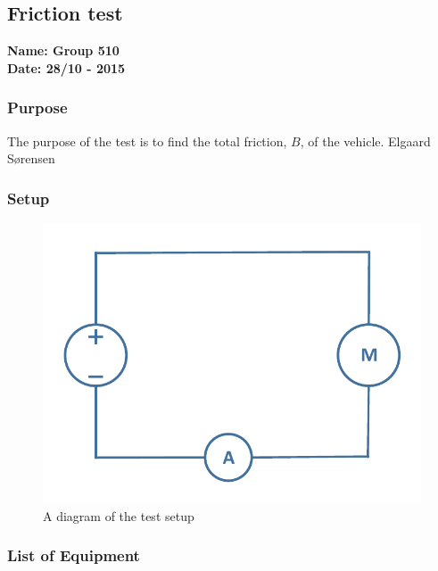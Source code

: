 \pagebreak
\subsection{Friction test} %
\textbf{Name: Group 510}\\
\textbf{Date: 28/10 - 2015}

\subsubsection{Purpose}
The purpose of the test is to find the total friction, $B$, of the vehicle.
Elgaard Sørensen
\subsubsection{Setup}
\begin{figure}[H]
  \centering
	\includegraphics[scale=0.5]{figures/FrictionTest.pdf}
	\caption{A diagram of the test setup}
\end{figure}

\subsubsection{List of Equipment}

